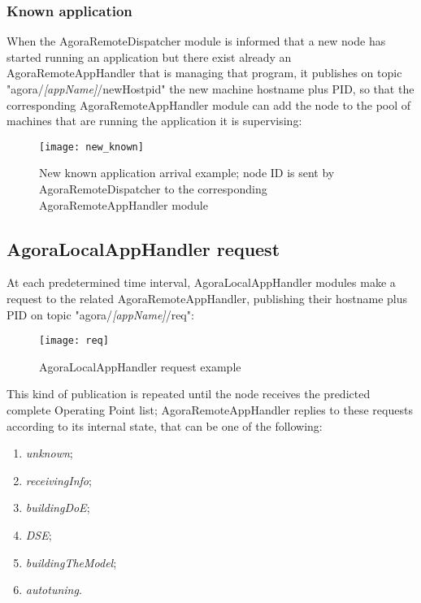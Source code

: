 \subsubsection{Known application}\label{knownApp}

When the AgoraRemoteDispatcher module is informed that a new node has started running an application but there exist already an AgoraRemoteAppHandler that is managing that program, it publishes on topic "agora\slash{}\textit{[app\-Name]}\slash{}newHostpid" the new machine hostname plus PID, so that the corresponding Agora\-Remote\-App\-Handler module can add the node to the pool of machines that are running the application it is supervising:

\begin{figure}[H]

    \centering
    \texttt{[image: new\_known]}
    \caption[New known application arrival example]{New known application arrival example; node ID is sent by AgoraRemoteDispatcher to the corresponding AgoraRemoteAppHandler module}
    
\end{figure}





\subsection{AgoraLocalAppHandler request}\label{clientReq}

At each predetermined time interval, AgoraLocalAppHandler modules make a request to the related AgoraRemoteAppHandler, publishing their hostname plus PID on topic "agora/\textit{[appName]}/req":

\begin{figure}[H]

    \centering
    \texttt{[image: req]}
    \caption{AgoraLocalAppHandler request example}
    
\end{figure}

This kind of publication is repeated until the node receives the predicted complete Operating Point list; AgoraRemoteAppHandler replies to these requests according to its internal state, that can be one of the following:

\begin{enumerate}

    \item \textit{unknown};

    \item \textit{receivingInfo};

    \item \textit{buildingDoE};

    \item \textit{DSE};

    \item \textit{buildingTheModel};

    \item \textit{autotuning}.

\end{enumerate}


